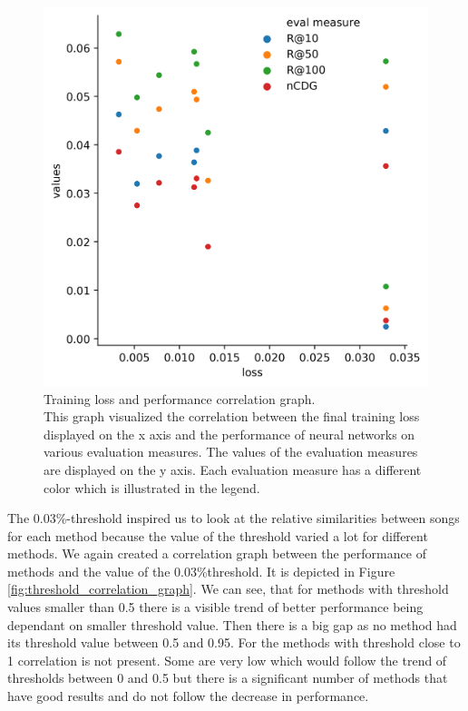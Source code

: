 \begin{figure}[h]
    \centering
	\includegraphics[width=1\linewidth]{./img/nn_training_performance_correlation.png}
	\caption[Training loss and performance correlation graph]{Training loss and performance correlation graph. \\ This graph visualized the correlation between the final training loss displayed on the x axis and the performance of neural networks on various evaluation measures. The values of the evaluation measures are displayed on the y axis. Each evaluation measure has a different color which is illustrated in the legend.}
	\label{fig:training_correlation_graph}
\end{figure}

The 0.03\%-threshold inspired us to look at the relative similarities between songs for each method because the value of the threshold varied a lot for different methods. We again created a correlation graph between the performance of methods and the value of the 0.03\%threshold. It is depicted in Figure \ref{fig:threshold_correlation_graph}. We can see, that for methods with threshold values smaller than 0.5 there is a visible trend of better performance being dependant on smaller threshold value. Then there is a big gap as no method had its threshold value between 0.5 and 0.95. For the methods with threshold close to 1 correlation is not present. Some are very low which would follow the trend of thresholds between 0 and 0.5 but there is a significant number of methods that have good results and do not follow the decrease in performance.

